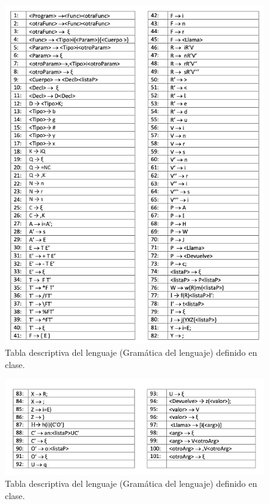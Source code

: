 \documentclass[12pt, a4paper]{article}
\begin{document}
\begin{figure}[htpb!]
  \centering
    \includegraphics[width=\textwidth]{gram.png}
  \caption{Tabla descriptiva del lenguaje (Gramática del lenguaje) definido en clase.}
\end{figure}\par

\newpage

\begin{figure}[htpb!]
  \centering
    \includegraphics[width=\textwidth]{gram2.png}
  \caption{Tabla descriptiva del lenguaje (Gramática del lenguaje) definido en clase.}
\end{figure}\par
\end{document}
